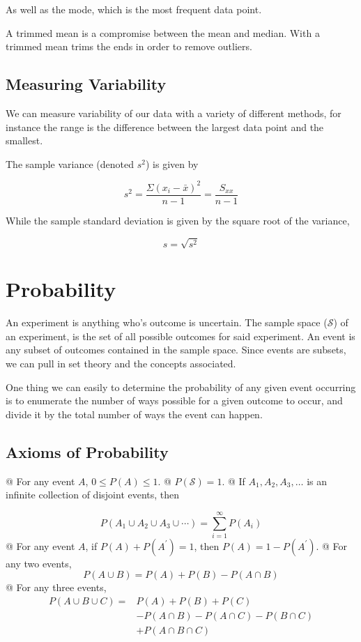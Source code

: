     As well as the mode, which is the most frequent data point.

    A trimmed mean is a compromise between the mean and median. With a trimmed mean trims the ends in order to remove
    outliers.

    \subsection{Measuring Variability}
    We can measure variability of our data with a variety of different methods, for instance the range is the difference
    between the largest data point and the smallest.

    The sample variance (denoted $s^2$) is given by

        \[ s^2 = \frac{\Sigma {\left( x_i - \bar{x} \right) }^2}{n-1} = \frac{S_{xx}}{n-1} \]

    While the sample standard deviation is given by the square root of the variance,

        \[ s = \sqrt{s^2} \]

\section{Probability}
An experiment is anything who's outcome is uncertain. The sample space ($\mathcal{S}$) of an experiment, is the set of
all possible outcomes for said experiment. An event is any subset of outcomes contained in the sample space. Since
events are subsets, we can pull in set theory and the concepts associated.\newline

One thing we can easily to determine the probability of any given event occurring is to enumerate the number of ways
possible for a given outcome to occur, and divide it by the total number of ways the event can happen.

    \subsection{Axioms of Probability}
    \noindent
    \NewList
    \begin{easylist}[itemize]
    @ For any event $A$, $0 \le P(A) \le 1$.
    @ $P(\mathcal{S}) = 1$.
    @ If $A_1, A_2, A_3, \ldots$ is an infinite collection of disjoint events, then

        \[ P(A_1 \cup A_2 \cup A_3 \cup \cdots) = \sum^\infty_{i=1}P(A_i) \]
    @ For any event $A$, if $P(A) + P(A^\prime) = 1$, then $P(A) = 1 - P(A^\prime)$.
    @ For any two events,
        \[ P(A \cup B) = P(A) + P(B) - P(A \cap B) \]
    @ For any three events,
        \[ \begin{aligned}
            P(A \cup B \cup C) =& P(A) + P(B) + P(C)\\
                                & - P(A \cap B) - P(A \cap C) - P(B \cap C)\\
                                & + P(A \cap B \cap C)
        \end{aligned} \]
    \end{easylist}

